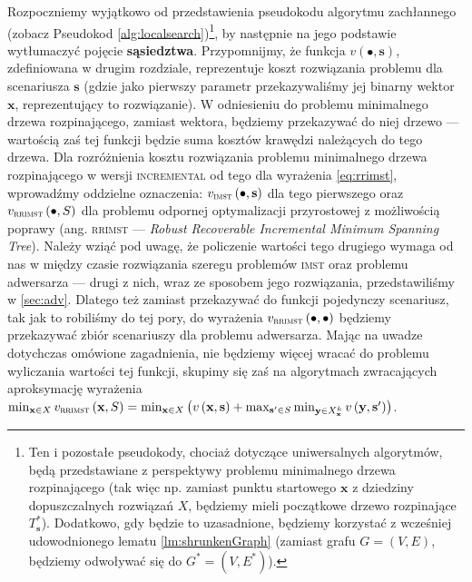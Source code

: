 Rozpoczniemy wyjątkowo od przedstawienia pseudokodu algorytmu zachłannego (zobacz Pseudokod \ref{alg:localsearch})\footnote{Ten i pozostałe pseudokody, chociaż dotyczące uniwersalnych algorytmów, będą przedstawiane z perspektywy problemu minimalnego drzewa rozpinającego (tak więc np. zamiast punktu startowego $\textbf{x}$ z dziedziny dopuszczalnych rozwiązań $X$, będziemy mieli początkowe drzewo rozpinające $T^{\ast}_{\textbf{s}}$). Dodatkowo, gdy będzie to uzasadnione, będziemy korzystać z wcześniej udowodnionego lematu \ref{lm:shrunkenGraph} (zamiast grafu $G = \left( V, E \right)$, będziemy odwoływać się do $G^{\ast} = \left( V, E^{\ast} \right)$).}, by następnie na jego podstawie wytłumaczyć pojęcie \textbf{sąsiedztwa}. Przypomnijmy, że funkcja $v \left( \bullet, \textbf{s} \right)$, zdefiniowana w drugim rozdziale, reprezentuje koszt rozwiązania problemu dla scenariusza $\textbf{s}$ (gdzie jako pierwszy parametr przekazywaliśmy jej binarny wektor $\textbf{x}$, reprezentujący to rozwiązanie). W odniesieniu do problemu minimalnego drzewa rozpinającego, zamiast wektora, będziemy przekazywać do niej drzewo --- wartością zaś tej funkcji będzie suma kosztów krawędzi należących do tego drzewa. Dla rozróżnienia kosztu rozwiązania problemu minimalnego drzewa rozpinającego w wersji \textsc{incremental} od tego dla wyrażenia \ref{eq:rrimst}, wprowadźmy oddzielne oznaczenia: $v_{\textsc{imst}} \left( \bullet, \textbf{s} \right)$ dla tego pierwszego oraz $v_{\textsc{rrimst}} \left( \bullet, S \right)$ dla problemu odpornej optymalizacji przyrostowej z możliwością poprawy (ang. \textsc{rrimst} --- \textit{Robust Recoverable Incremental Minimum Spanning Tree}). Należy wziąć pod uwagę, że policzenie wartości tego drugiego wymaga od nas w między czasie rozwiązania szeregu problemów \textsc{imst} oraz problemu adwersarza --- drugi z nich, wraz ze sposobem jego rozwiązania, przedstawiliśmy w \ref{sec:adv}. Dlatego też zamiast przekazywać do funkcji pojedynczy scenariusz, tak jak to robiliśmy do tej pory, do wyrażenia $v_{\textsc{rrimst}} \left( \bullet, \bullet \right)$ będziemy przekazywać zbiór scenariuszy dla problemu adwersarza. Mając na uwadze dotychczas omówione zagadnienia, nie będziemy więcej wracać do problemu wyliczania wartości tej funkcji, skupimy się zaś na algorytmach zwracających aproksymację wyrażenia $\min_{\textbf{x} \in X} v_{\textsc{rrimst}} \left( \textbf{x}, S \right) = \min_{\textbf{x} \in X} \left( v \left( \textbf{x}, \textbf{s} \right) + \max_{\textbf{s}^{\prime} \in S} \min_{\textbf{y} \in X^{k}_{\textbf{x}}} v \left( \textbf{y}, \textbf{s}^{\prime} \right) \right)$.
\vspace*{-8pt}

